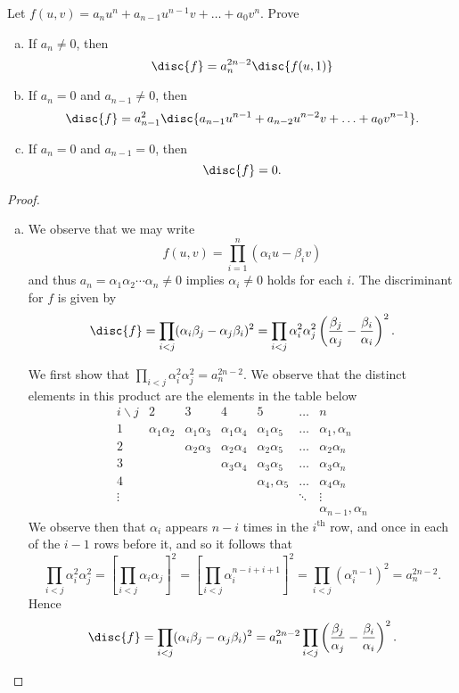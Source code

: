 \documentclass[10pt]{amsart}
\begin{document}
\begin{thm}
  Let $f(u,v) = a_nu^n + a_{n-1}u^{n-1}v + \ldots + a_0v^n$.
  Prove
  \begin{enumerate}[(a)]
  \item
    If $a_n \neq 0$, then
    $$\disc{f} = a_n^{2n - 2}\disc{f(u,1)}$$
  \item
    If $a_n = 0$ and $a_{n-1} \neq 0$, then
    $$\disc{f} = a_{n-1}^2 \disc{a_{n-1}u^{n-1} + a_{n-2}u^{n-2}v + \ldots + a_0v^{n-1}}.$$
  \item
    If $a_n = 0$ and $a_{n-1} = 0$, then
    $$\disc{f} = 0.$$
  \end{enumerate}
  
  \begin{proof}
    \begin{enumerate}[(a)]
    \item\label{1.a}
      We observe that we may write 
      $$f(u,v) = \prod_{i = 1}^n (\alpha_iu - \beta_iv)$$
      and thus $a_n = \alpha_1\alpha_2 \cdots \alpha_n \neq 0$ implies $\alpha_i \neq 0$ holds for each $i$.
      The discriminant for $f$ is given by
      $$\disc{f} = \prod_{i < j} (\alpha_i\beta_j - \alpha_j\beta_i)^2 = \prod_{i < j} \alpha_i^2\alpha_j^2\left(\frac{\beta_j}{\alpha_j} - \frac{\beta_i}{\alpha_i}\right)^2.$$
      
      We first show that $\prod_{i < j} \alpha_i^2\alpha_j^2 = a_n^{2n - 2}$.
      We observe that the distinct elements in this product are the elements in the table below
      $$\begin{array}{c||cccccc}
        i \backslash j & 2 & 3 & 4 & 5 & \ldots &n\\
        \hline
        1 &  \alpha_1\alpha_2 & \alpha_1\alpha_3 & \alpha_1\alpha_4 & \alpha_1\alpha_5 & \ldots & \alpha_1,\alpha_n\\
        2 && \alpha_2\alpha_3 & \alpha_2\alpha_4 & \alpha_2\alpha_5 & \ldots & \alpha_2\alpha_n\\
        3 &&       & \alpha_3\alpha_4 & \alpha_3\alpha_5 & \ldots & \alpha_3\alpha_n\\
        4 &&       &       & \alpha_4,\alpha_5 & \ldots & \alpha_4\alpha_n\\
        \vdots &&       &       &       & \ddots & \vdots\\
        &&&&&&\alpha_{n-1},\alpha_n
      \end{array}$$
      We observe then that $\alpha_i$ appears $n - i$ times in the $i^\text{th}$ row, and once in each of the $i - 1$ rows before it, and so it follows that
      $$\prod_{i < j} \alpha_i^2\alpha_j^2 = \left[\prod_{i < j} \alpha_i\alpha_j\right]^2 = \left[\prod_{i < j} \alpha_i^{n-i + i + 1}\right]^2 = \prod_{i < j}(\alpha_i^{n-1})^2 = a_n^{2n-2}.$$
      Hence 
      $$\disc{f} = \prod_{i < j} (\alpha_i\beta_j - \alpha_j\beta_i)^2 = a_n^{2n-2}\prod_{i < j} \left(\frac{\beta_j}{\alpha_j} - \frac{\beta_i}{\alpha_i}\right)^2.$$
      

\end{enumerate}
\end{proof}
\end{thm}
\end{document}
